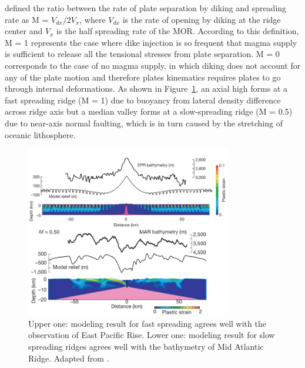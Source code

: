 \citet{Buck2005} %
defined the ratio between the rate of plate separation by diking and spreading rate as M = $V_{dx}/2V_{x}$, where $V_{dx}$ is the rate of opening by diking at the ridge center and $V_{x}$ is the half spreading rate of the MOR. According to this definition, M = 1 represents the case where dike injection is so frequent that magma supply is sufficient to release all the tensional stresses from plate separation. M = 0 corresponds to the case of no magma supply, in which diking does not account for any of the plate motion and therefore plates kinematics requires plates to go through internal deformations. As shown in Figure~\ref{fig_Intro5_1}, an axial high forms at a fast spreading ridge (M = 1) due to buoyancy from lateral density difference across ridge axis but a median valley forms at a slow-spreading ridge (M = 0.5) due to near-axis normal faulting, which is in turn caused by the stretching of oceanic lithosphere.


\begin{figure}[h]
 \centering
  \includegraphics[width=0.8\textwidth]{./Figures/fig_Intro5_1.png}
 \caption{Upper one: modeling result for fast spreading agrees well with the observation of East Pacific Rise. Lower one: modeling result for slow spreading ridges agrees well with the bathymetry of Mid Atlantic Ridge. Adapted from \citep{Buck2005}.}
 \label{fig_Intro5_1}
\end{figure}

